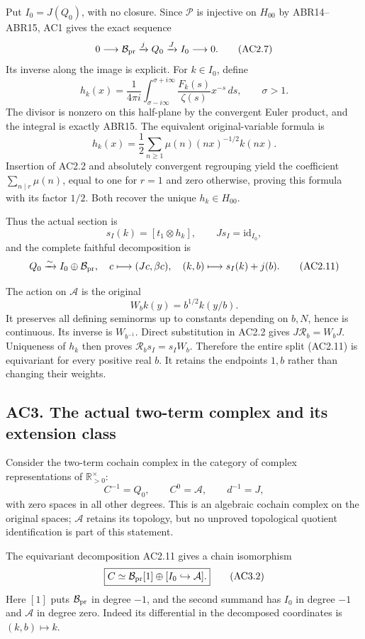 Put \(I_0=J(Q_0)\), with no closure. Since \(\mathcal P\) is injective
on \(H_{00}\) by ABR14--ABR15, AC1 gives the exact sequence \[
 0\longrightarrow\mathcal B_{\rm pr}\xrightarrow{j}Q_0
 \xrightarrow{J}I_0\longrightarrow0.
\tag{AC2.7}
\] Its inverse along the image is explicit. For \(k\in I_0\), define \[
 h_k(x)=\frac1{4\pi i}
 \int_{\sigma-i\infty}^{\sigma+i\infty}
 \frac{F_k(s)}{\zeta(s)}x^{-s}\,ds,\qquad\sigma>1.
\tag{AC2.8}
\] The divisor is nonzero on this half-plane by the convergent Euler
product, and the integral is exactly ABR15. The equivalent
original-variable formula is \[
 h_k(x)=\frac12\sum_{n\geq1}\mu(n)(nx)^{-1/2}k(nx).
\tag{AC2.9}
\] Insertion of AC2.2 and absolutely convergent regrouping yield the
coefficient \(\sum_{n\mid r}\mu(n)\), equal to one for \(r=1\) and zero
otherwise, proving this formula with its factor \(1/2\). Both recover
the unique \(h_k\in H_{00}\).

Thus the actual section is \[
 s_I(k)=[t_1\otimes h_k],\qquad Js_I=\mathrm{id}_{I_0},
\tag{AC2.10}
\] and the complete faithful decomposition is \[
 Q_0\xrightarrow{\sim} I_0\oplus\mathcal B_{\rm pr},
 \quad c\longmapsto(Jc,\beta c),\quad
 (k,b)\longmapsto s_I(k)+j(b).
\tag{AC2.11}
\]

The action on \(\mathcal A\) is the original \[
 W_bk(y)=b^{1/2}k(y/b).
\tag{AC2.12}
\] It preserves all defining seminorms up to constants depending on
\(b,N\), hence is continuous. Its inverse is \(W_{b^{-1}}\). Direct
substitution in AC2.2 gives \(J\mathscr R_b=W_bJ\). Uniqueness of
\(h_k\) then proves \(\mathscr R_b s_I=s_IW_b\). Therefore the entire
split (AC2.11) is equivariant for every positive real \(b\). It retains
the endpoints \(1,b\) rather than changing their weights.

\subsection{AC3. The actual two-term complex and its extension
class}\label{ac3.-the-actual-two-term-complex-and-its-extension-class}

Consider the two-term cochain complex in the category of complex
representations of \(\mathbb R_{>0}^{\times}\): \[
 C^{-1}=Q_0,\qquad C^0=\mathcal A,\qquad d^{-1}=J,
\tag{AC3.1}
\] with zero spaces in all other degrees. This is an algebraic cochain
complex on the original spaces; \(\mathcal A\) retains its topology, but
no unproved topological quotient identification is part of this
statement.

The equivariant decomposition AC2.11 gives a chain isomorphism \[
 \boxed{
 C\simeq \mathcal B_{\rm pr}[1]\oplus[I_0\hookrightarrow\mathcal A].
 }
\tag{AC3.2}
\] Here \([1]\) puts \(\mathcal B_{\rm pr}\) in degree \(-1\), and the
second summand has \(I_0\) in degree \(-1\) and \(\mathcal A\) in degree
zero. Indeed its differential in the decomposed coordinates is
\((k,b)\mapsto k\).

